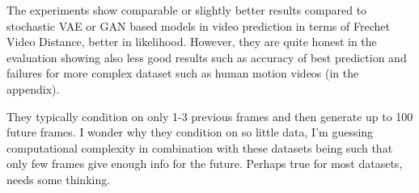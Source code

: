 The experiments show comparable or slightly better results compared to stochastic VAE or GAN based models in video prediction in terms of Frechet Video Distance, better in likelihood. However, they are quite honest in the evaluation showing also less good results such as accuracy of best prediction and failures for more complex dataset such as human motion videos (in the appendix).

They typically condition on only 1-3 previous frames and then generate up to 100 future frames. I wonder why they condition on so little data, I'm guessing computational complexity in combination with these datasets being such that only few frames give enough info for the future. Perhaps true for most datasets, needs some thinking.

